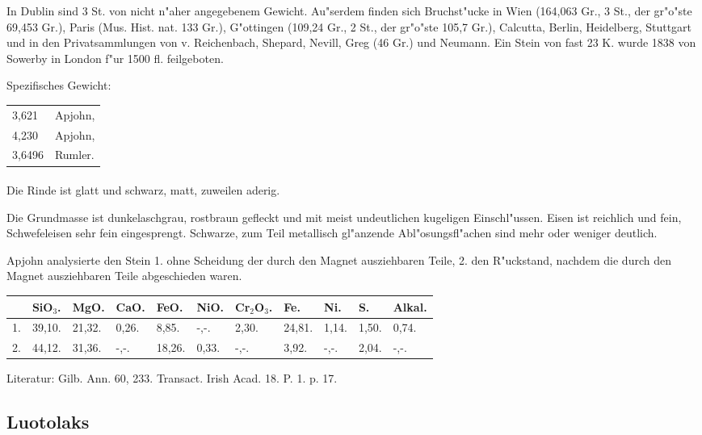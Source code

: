 \documentclass[a4paper, 11pt, oneside]{article}
\begin{document}
In Dublin sind 3 St. von nicht n"aher angegebenem Gewicht. Au"serdem finden sich Bruchst"ucke in Wien (164,063 Gr., 3 St., der gr"o"ste 69,453 Gr.), Paris (Mus. Hist. nat. 133 Gr.), G"ottingen (109,24 Gr., 2 St., der gr"o"ste 105,7 Gr.), Calcutta, Berlin, Heidelberg, Stuttgart und in den Privatsammlungen von v. Reichenbach, Shepard, Nevill, Greg (46 Gr.) und Neumann. Ein Stein von fast 23 K. wurde 1838 von Sowerby in London f"ur 1500 fl. feilgeboten.

Spezifisches Gewicht:
\begin{table}[!ht]
    \centering
    \begin{tabular}{l l}
        3,621 & Apjohn,\\
        4,230 & Apjohn,\\
        3,6496 & Rumler.
    \end{tabular}
\end{table}
\paragraph{}
Die Rinde ist glatt und schwarz, matt, zuweilen aderig.

Die Grundmasse ist dunkelaschgrau, rostbraun gefleckt und mit meist undeutlichen kugeligen Einschl"ussen. Eisen ist reichlich und fein, Schwefeleisen sehr fein eingesprengt. Schwarze, zum Teil metallisch gl"anzende Abl"osungsfl"achen sind mehr oder weniger deutlich.

Apjohn analysierte den Stein 1. ohne Scheidung der durch den Magnet ausziehbaren Teile, 2. den R"uckstand, nachdem die durch den Magnet ausziehbaren Teile abgeschieden waren.
\begin{table}[!ht]
    \centering
    \begin{tabular}{p{3mm} p{7mm} p{7mm} p{7mm} p{7mm} p{7mm} p{10mm} p{6mm} p{6mm} p{6mm} p{6mm}}
         & SiO$_{3}$. & MgO. & CaO. & FeO. & NiO. & Cr$_{2}$O$_{3}$. & Fe. & Ni. & S. & Alkal. \\ \hline
        1. & 39,10. & 21,32. & 0,26. & 8,85. & -,-. & 2,30. & 24,81. & 1,14. & 1,50. & 0,74. \\
        2. & 44,12. & 31,36. & -,-. & 18,26. & 0,33. & -,-. & 3,92. & -,-. & 2,04. & -,-. \\
    \end{tabular}
\end{table}

\footnotesize
Literatur: Gilb. Ann. 60, 233. Transact. Irish Acad. 18. P. 1. p. 17.
\subsection{Luotolaks}
\normalsize
\end{document}
